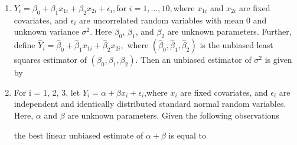 \documentclass[journal]{IEEEtran}
\begin{document}
\begin{enumerate}
\begin{enumerate}
\end{enumerate}
\item $Y_i = \beta_0 + \beta_1 x_{1i} + \beta_2 x_{2i} + \epsilon_i,$for $i = 1, \ldots, 10,$where $x_{1i}$ and $x_{2i}$ are fixed covariates, and $\epsilon_i$ are uncorrelated random variables with mean 0 and unknown variance $\sigma^2$. Here $\beta_0$, $\beta_1$, and $\beta_2$ are unknown parameters. Further, define $\hat{Y}_i = \hat{\beta}_0 + \hat{\beta}_1 x_{1i} + \hat{\beta}_2 x_{2i},$ where $(\hat{\beta}_0, \hat{\beta}_1, \hat{\beta}_2)$ is the unbiased least squares estimator of $(\beta_0, \beta_1, \beta_2)$. Then an unbiased estimator of $\sigma^2$ is given by 
\begin{enumerate}
\end{enumerate}
\item For i = 1, 2, 3, let $Y_i = \alpha + \beta x_i + \epsilon_i$,where $x_i$ are fixed covariates, and  $\epsilon_i$ are independent and identically distributed standard normal random variables. Here, $\alpha$ and $\beta$ are unknown parameters. Given the following observations \begin{table}[h!]
        \centering
  
\end{table}
the best linear unbiased estimate of $\alpha + \beta$ is equal to
\begin{enumerate}
\end{enumerate}
\end{enumerate}
\end{document}
